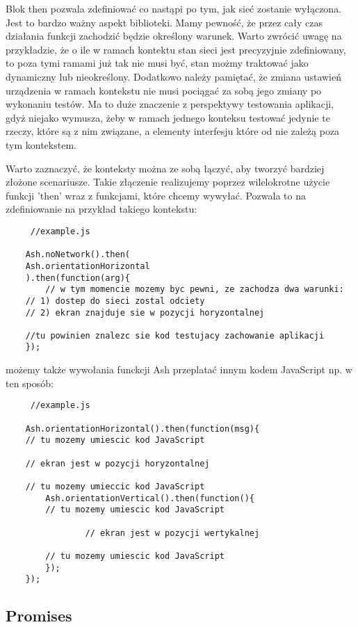 \documentclass[a4paper]{article}
\begin{document}
Blok then pozwala zdefiniować co nastąpi po tym, jak sieć zostanie wyłączona. Jest to bardzo ważny aspekt biblioteki. Mamy pewność, że przez cały czas działania funkcji zachodzić będzie określony warunek. Warto zwrócić uwagę na przykładzie, że o ile w ramach kontektu stan sieci jest precyzyjnie zdefiniowany, to poza tymi ramami już tak nie musi być, stan możmy traktować jako dynamiczny lub nieokreślony. Dodatkowo należy pamiętać, że zmiana ustawień urządzenia w ramach kontekstu nie musi pociągać za sobą jego zmiany po wykonaniu testów. Ma to duże znaczenie z perspektywy testowania aplikacji, gdyż niejako wymusza, żeby w ramach jednego konteksu testować jedynie te rzeczy, które są z nim związane, a elementy interfesju które od nie zależą poza tym kontekstem.

Warto zaznaczyć, że konteksty można ze sobą łączyć, aby tworzyć bardziej złożone scenariusze. Takie złączenie realizujemy poprzez wilelokrotne użycie funkcji 'then' wraz z funkcjami, które chcemy wywyłać. Pozwala to na zdefiniowanie na przykład takiego kontekstu:

\begin{lstlisting}
     //example.js

    Ash.noNetwork().then(
	Ash.orientationHorizontal
    ).then(function(arg){
      	// w tym momencie mozemy byc pewni, ze zachodza dwa warunki:
	// 1) dostep do sieci zostal odciety 
	// 2) ekran znajduje sie w pozycji horyzontalnej

	//tu powinien znalezc sie kod testujacy zachowanie aplikacji 
    });
\end{lstlisting}

możemy także wywołania funckcji Ash przeplatać innym kodem JavaScript np. w ten sposób:

\begin{lstlisting}
     //example.js

    Ash.orientationHorizontal().then(function(msg){
	// tu mozemy umiescic kod JavaScript
      	
	// ekran jest w pozycji horyzontalnej
      
	// tu mozemy umieccic kod JavaScript
      	Ash.orientationVertical().then(function(){
		// tu mozemy umiescic kod JavaScript

        		// ekran jest w pozycji wertykalnej 

		// tu mozemy umiescic kod JavaScript
      	});
    });
\end{lstlisting}

\subsection{Promises}
\end{document}
